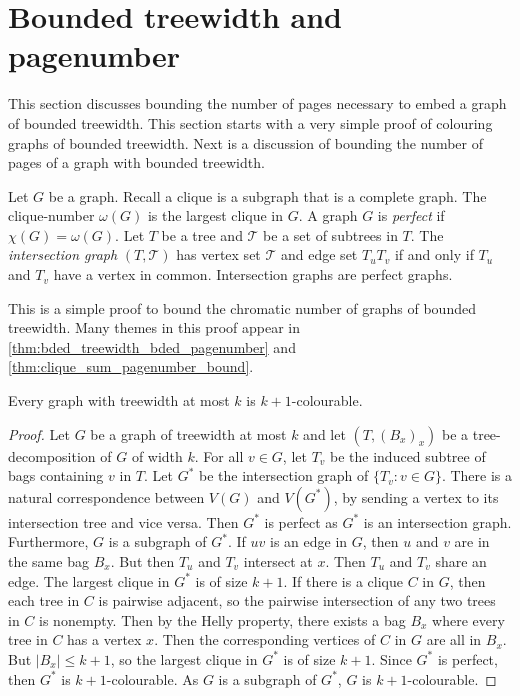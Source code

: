
\section{Bounded treewidth and pagenumber}\label{sec:Bounded_Treewidth}

This section discusses bounding the number of pages necessary to embed a graph of bounded treewidth. This section starts with a very simple proof of colouring graphs of bounded treewidth. Next is a discussion of bounding the number of pages of a graph with bounded treewidth.

Let $G$ be a graph. Recall a clique is a subgraph that is a complete graph. The clique-number $\omega(G)$ is the largest clique in $G$. A graph $G$ is \textit{perfect} if $\chi(G) = \omega(G)$. Let $T$ be a tree and $\mathcal{T}$ be a set of subtrees in $T$. The \textit{intersection graph} $(T, \mathcal{T})$ has vertex set $\mathcal{T}$ and edge set $T_u T_v$ if and only if $T_u$ and $T_v$ have a vertex in common. Intersection graphs are perfect graphs. 

This is a simple proof to bound the chromatic number of graphs of bounded treewidth. Many themes in this proof appear in \cref{thm:bded_treewidth_bded_pagenumber} and \cref{thm:clique_sum_pagenumber_bound}. 
\begin{theorem}
	Every graph with treewidth at most $k$ is $k + 1$-colourable.
\end{theorem}

\begin{proof}
	Let $G$ be a graph of treewidth at most $k$ and let $(T, {(B_x)}_x)$ be a tree-decomposition of $G$ of width $k$. For all $v \in G$, let $T_v$ be the induced subtree of bags containing $v$ in $T$. Let $G^*$ be the intersection graph of $\{T_v : v \in G\}$. There is a natural correspondence between $V(G)$ and $V(G^*)$, by sending a vertex to its intersection tree and vice versa. Then $G^*$ is perfect as $G^*$ is an intersection graph. Furthermore, $G$ is a subgraph of $G^*$. If $uv$ is an edge in $G$, then $u$ and $v$ are in the same bag $B_x$. But then $T_u$ and $T_v$ intersect at $x$. Then $T_u$ and $T_v$ share an edge. The largest clique in $G^*$ is of size $k + 1$. If there is a clique $C$ in $G$, then each tree in $C$ is pairwise adjacent, so the pairwise intersection of any two trees in $C$ is nonempty. Then by the Helly property, there exists a bag $B_x$ where every tree in $C$ has a vertex $x$. Then the corresponding vertices of $C$ in $G$ are all in $B_x$. But $|B_x| \leq k + 1$, so the largest clique in $G^*$ is of size $k + 1$. Since $G^*$ is perfect, then $G^*$ is $k + 1$-colourable. As $G$ is a subgraph of $G^*$, $G$ is $k + 1$-colourable. 
\end{proof}

